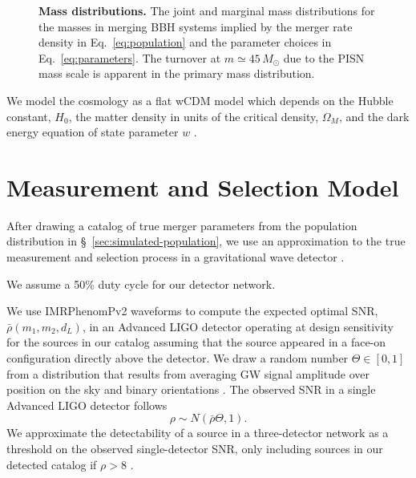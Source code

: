 \documentclass[modern]{aastex62}
\newcommand{\MPISN}{45 \, \MSun{}}
\newcommand{\MSun}{M_\odot}
\begin{document}
\begin{figure}
%
  \caption{\label{fig:marginal-masses} \textbf{Mass distributions.} The joint
  and  marginal mass distributions for the masses in merging \ac{BBH} systems
  implied by the merger rate density in Eq.\ \eqref{eq:population} and the
  parameter choices in Eq.\ \eqref{eq:parameters}. The turnover at $m \simeq
  \MPISN{}$ due to the \ac{PISN} mass scale is apparent in the primary mass
  distribution.}
%
\end{figure}

We model the cosmology as a flat wCDM model which depends on the Hubble
constant, $H_0$, the matter density in units of the critical density,
$\Omega_M$, and the dark energy equation of state parameter $w$
\citep{Hogg1999}.

\section{Measurement and Selection Model}
\label{sec:measurement}

After drawing a catalog of true merger parameters from the population
distribution in \S\ \ref{sec:simulated-population}, we use an approximation
\citep{Fishbach2018} to the true measurement and selection process in a
gravitational wave detector \citep{Veitch2015}.

We assume a 50\% duty cycle for our detector network.

We use IMRPhenomPv2 waveforms \citep{Hannam2014} to compute the expected optimal
\ac{SNR}, $\bar{\rho}\left( m_1, m_2, d_L \right)$, in an Advanced LIGO detector
operating at design sensitivity \citep{ObsScenarios} for the sources in our
catalog assuming that the source appeared in a face-on configuration directly
above the detector.  We draw a random number $\Theta \in [0,1]$ from a
distribution that results from averaging \ac{GW} signal amplitude over position
on the sky and binary orientations \citep{Finn1993}.  The observed \ac{SNR} in a
single Advanced LIGO detector follows
%
\begin{equation}
  \rho \sim N\left( \bar{\rho} \Theta, 1 \right).
\end{equation}
%
We approximate the detectability of a source in a three-detector network as a
threshold on the observed single-detector \ac{SNR}, only including sources in
our detected catalog if $\rho > 8$ \citep{GW150914RateSupplement}.
\end{document}

